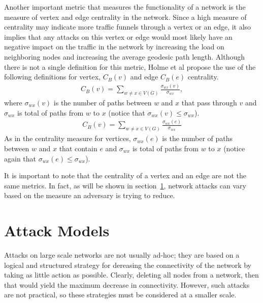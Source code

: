 \documentclass[doc]{apa}%
\begin{document}
Another important metric that measures the functionality of a network is the measure of vertex and edge centrality in the network. Since a high measure of centrality may indicate more traffic funnels through a vertex or an edge, it also implies that any attacks on this vertex or edge would most likely have an negative impact on the traffic in the network by increasing the load on neighboring nodes and increasing the average geodesic path length. Although there is not a single definition for this metric, Holme et al \cite{Attacks} propose the use of the following definitions for vertex, $C_{B}(v)$ and edge $C_{B}(e)$ centrality.
\begin{eqnarray*}
C_{B}(v) = \sum_{w \not= x \in V(G)} \frac{\sigma_{wx}(v)}{\sigma_{wx}},
\end{eqnarray*}
where $\sigma_{wx}(v)$ is the number of paths between $w$ and $x$ that pass through $v$ and $\sigma_{wx}$ is total of paths from $w$ to $x$ (notice that $\sigma_{wx}(v) \leq \sigma_{wx}$).
\begin{eqnarray*}
C_{B}(v) = \sum_{w \not= x \in V(G)} \frac{\sigma_{wx}(e)}{\sigma_{wx}}
\end{eqnarray*}
As in the centrality measure for vertices, $\sigma_{wx}(e)$ is the number of paths between $w$ and $x$ that contain $e$ and $\sigma_{wx}$ is total of paths from $w$ to $x$ (notice again that $\sigma_{wx}(e) \leq \sigma_{wx}$).

It is important to note that the centrality of a vertex and an edge are not the same metrics. In fact, as will be shown in section~\ref{AttackStrategies}, network attacks can vary based on the measure an adversary is trying to reduce. 




\section{Attack Models}
\label{AttackStrategies}
Attacks on large scale networks are not usually ad-hoc; they are based on a logical and structured strategy for dereasing the connectivity of the network by taking as little action as possible. Clearly, deleting all nodes from a network, then that would yield the maximum decrease in connectivity. However, such attacks are not practical, so these strategies must be considered at a smaller scale. 
\end{document}
